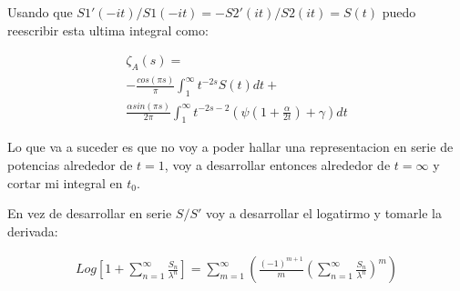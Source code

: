 \begin{comment}
A la hora de calcular los terminos de la forma $S'/S$ hay que tener en cuenta hasta que orden hay que llevar el numerado y el denominador para poder ser consitente con la expancion en serie.

\begin{equation}
\begin{array}{c}
\frac{S'(x)}{S(x)} =
\frac{
		- \sum _{n=1} ^{\infty} \frac{n a_n}{x ^{n+1}}
      }
      {
		1 + \sum _{m=1} ^{\infty} \frac{a _n}{x ^{n}}
            } =
            

\left(
	    - \sum _{n=1} ^{\infty} \frac{n a_n}{x ^{n+1}}
		\right)
\sum _{p =0} ^{\infty}
		\left(
			    \sum _{m=1} ^{\infty} \frac{a _n}{x ^{n}}
	    		\right) ^{p}
\end{array}
\end{equation}

Donde se puede hacer el producto de Cauchy para tener la solucion exacta de hasta que terminos hay que desarrollar $S,S'$ y la Serie Geometrica.
\end{comment}

Usando que $S1' (-it)/S1 (-i t) = - S2 ' (i t) / S2(it)  = S(t) $ puedo reescribir esta ultima integral como:

\begin{equation}
\begin{array}{c}
\zeta _A (s) =  \\
- \frac{cos (\pi s)}{\pi} \int _1 ^{\infty} t ^{-2s} S(t) dt + \\
\frac{\alpha sin( \pi s )}{2 \pi } \int _{1} ^{\infty} 
t ^{-2s-2} \left( \psi (1 + \frac{\alpha}{2 t}) + \gamma \right) dt
\end{array}
\end{equation}

Lo que va a suceder es que no voy a poder hallar una representacion en serie de potencias alrededor de $t=1$, voy a desarrollar entonces alrededor de $t = \infty$ y cortar mi integral en $t _0$.




En vez de desarrollar en serie $S/S'$ voy a desarrollar el logatirmo y tomarle la derivada:

\begin{equation}
\begin{array}{c}

Log 
\left[
	1 + \sum _{n=1} ^{\infty}  \frac{S _n}{\lambda ^n}
	\right] =
	
\sum _{m = 1} ^{\infty} 
	\left(
	\frac{(-1) ^{m+1} }{m}
	\left(
		\sum _{n=1} ^{\infty} \frac{S _n}{\lambda ^n}
		\right) ^m 
	\right)
\end{array}	
\end{equation}

